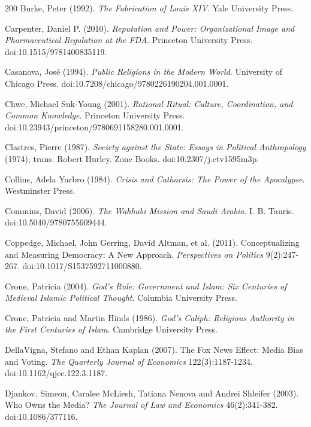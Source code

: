 \documentclass[11pt,letterpaper]{article}
\theoremstyle{definition}
\theoremstyle{remark}
\begin{document}
\begin{thebibliography}{200}
Burke, Peter (1992). \emph{The Fabrication of Louis XIV}. Yale University Press.

Carpenter, Daniel P. (2010). \emph{Reputation and Power: Organizational Image and Pharmaceutical Regulation at the FDA}. Princeton University Press. doi:10.1515/9781400835119.

Casanova, Jos\'e (1994). \emph{Public Religions in the Modern World}. University of Chicago Press. doi:10.7208/chicago/9780226190204.001.0001.

Chwe, Michael Suk-Young (2001). \emph{Rational Ritual: Culture, Coordination, and Common Knowledge}. Princeton University Press. doi:10.23943/princeton/9780691158280.001.0001.

Clastres, Pierre (1987). \emph{Society against the State: Essays in Political Anthropology} (1974), trans. Robert Hurley. Zone Books. doi:10.2307/j.ctv1595m3p.

Collins, Adela Yarbro (1984). \emph{Crisis and Catharsis: The Power of the Apocalypse}. Westminster Press.

Commins, David (2006). \emph{The Wahhabi Mission and Saudi Arabia}. I. B. Tauris. doi:10.5040/9780755609444.

Coppedge, Michael, John Gerring, David Altman, et al. (2011). Conceptualizing and Measuring Democracy: A New Approach. \emph{Perspectives on Politics} 9(2):247-267. doi:10.1017/S1537592711000880.

Crone, Patricia (2004). \emph{God's Rule: Government and Islam: Six Centuries of Medieval Islamic Political Thought}. Columbia University Press.

Crone, Patricia and Martin Hinds (1986). \emph{God's Caliph: Religious Authority in the First Centuries of Islam}. Cambridge University Press.

DellaVigna, Stefano and Ethan Kaplan (2007). The Fox News Effect: Media Bias and Voting. \emph{The Quarterly Journal of Economics} 122(3):1187-1234. doi:10.1162/qjec.122.3.1187.

Djankov, Simeon, Caralee McLiesh, Tatiana Nenova and Andrei Shleifer (2003). Who Owns the Media? \emph{The Journal of Law and Economics} 46(2):341-382. doi:10.1086/377116.


\end{thebibliography}
\end{document}
